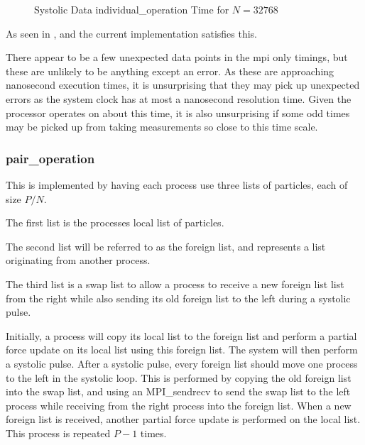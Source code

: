 \begin{figure}
    
    \caption{Systolic Data individual\_operation Time for $N = 32768$}
    \label{fig:v0_systolic_individual_operation_32768_logtime}
\end  {figure}

As seen in
,
 and
the current implementation satisfies this.

There appear to be a few unexpected data points in the mpi only timings,
but these are unlikely to be anything except an error.
%
As these are approaching nanosecond execution times, it is
unsurprising that they may pick up unexpected errors as the system clock
has at most a nanosecond resolution time.
%
Given the processor operates on about this time, it is also unsurprising
if some odd times may be picked up from taking measurements so
close to this time scale.


%
%

\subsubsection{pair\_operation}
This is implemented by having each process use three lists of particles,
each of size $P/N$.

The first list is the processes local list of particles.

The second list will be referred to as the foreign list, and
represents a list originating from another process.

The third list is a swap list to allow a process to receive a new
foreign list list from the right
while also sending its old foreign list to the left
during a systolic pulse.

Initially, a process will copy its local list to the foreign list
and perform a partial force update on its local list using this
foreign list.
%
The system will then perform a systolic pulse.
After a systolic pulse, every foreign list should move one process
to the left in the systolic loop.
%
This is performed by copying the old foreign list into the
swap list, and using an MPI\_sendrecv to send the swap list to
the left process while receiving from
the right process into the foreign list.
%
When a new foreign list is received, another partial force update
is performed on the local list.
%
This process is repeated $P-1$ times.


